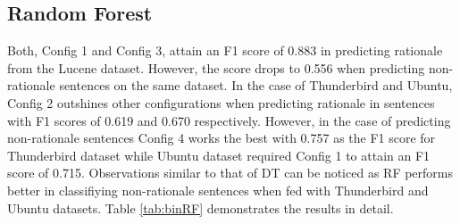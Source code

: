 \documentclass[a4paper,12pt,twoside]{report}
\begin{document}
\subsection{Random Forest}
Both, Config 1 and Config 3, attain an F1 score of 0.883 in predicting rationale from the Lucene dataset. However, the score drops to 0.556 when predicting non-rationale sentences on the same dataset. In the case of Thunderbird and Ubuntu, Config 2 outshines other configurations when predicting rationale in sentences with F1 scores of 0.619 and 0.670 respectively. However, in the case of predicting non-rationale sentences Config 4 works the best with 0.757 as the F1 score for Thunderbird dataset while Ubuntu dataset required Config 1 to attain an F1 score of 0.715. Observations similar to that of \acs{DT} can be noticed as \acs{RF} performs better in classifiying non-rationale sentences when fed with Thunderbird and Ubuntu datasets. Table \ref{tab:binRF} demonstrates the results in detail. 
\end{document}
